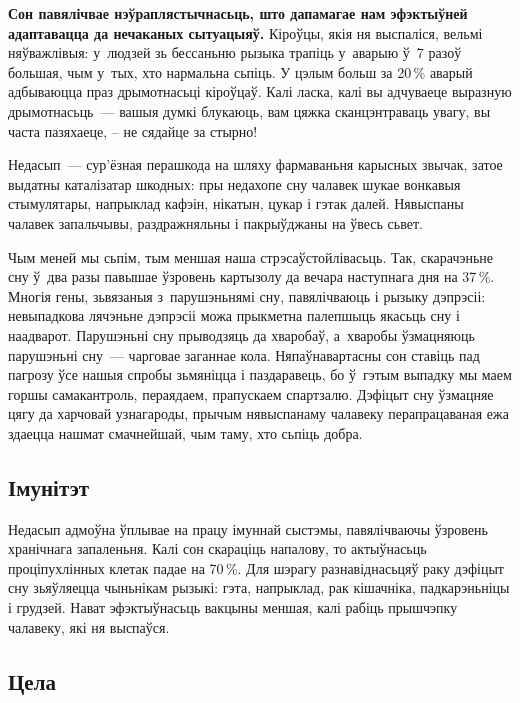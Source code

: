 \textbf{Сон павялічвае нэўраплястычнасьць, што дапамагае нам эфэктыўней адаптавацца да нечаканых сытуацыяў.} Кіроўцы, якія ня выспаліся, вельмі няўважлівыя: у~людзей зь бессаньню рызыка трапіць у~аварыю ў~7 разоў большая, чым у~тых, хто нармальна сьпіць. У цэлым больш за 20\,\% аварый адбываюцца праз дрымотнасьці кіроўцаў. Калі ласка, калі вы адчуваеце выразную дрымотнасьць~--- вашыя думкі блукаюць, вам цяжка сканцэнтраваць увагу, вы часта пазяхаеце, -- не сядайце за стырно!

Недасып~--- сур'ёзная перашкода на шляху фармаваньня карысных звычак, затое выдатны каталізатар шкодных: пры недахопе сну чалавек шукае вонкавыя стымулятары, напрыклад кафэін, нікатын, цукар і гэтак далей. Нявыспаны чалавек запальчывы, раздражняльны і пакрыўджаны на ўвесь сьвет. 


Чым меней мы сьпім, тым меншая наша стрэсаўстойлівасьць. Так, скарачэньне сну ў~два разы павышае ўзровень картызолу да вечара наступнага дня на 37\,\%. Многія гены, зьвязаныя з~парушэньнямі сну, павялічваюць і рызыку дэпрэсіі: невыпадкова лячэньне дэпрэсіі можа прыкметна палепшыць якасьць сну і наадварот. Парушэньні сну прыводзяць да хваробаў, а~хваробы ўзмацняюць парушэньні сну~--- чарговае заганнае кола. Няпаўнавартасны сон ставіць пад пагрозу ўсе нашыя спробы зьмяніцца і паздаравець, бо ў~гэтым выпадку мы маем горшы самакантроль, пераядаем, прапускаем спартзалю. Дэфіцыт сну ўзмацняе цягу да харчовай узнагароды, прычым нявыспанаму чалавеку перапрацаваная ежа здаецца нашмат смачнейшай, чым таму, хто сьпіць добра.

\subsection*{Імунітэт}

Недасып адмоўна ўплывае на працу імуннай сыстэмы, павялічваючы ўзровень хранічнага запаленьня. Калі сон скараціць напалову, то актыўнасьць проціпухлінных клетак падае на 70\,\%. Для шэрагу разнавіднасьцяў раку дэфіцыт сну зьяўляецца чыньнікам рызыкі: гэта, напрыклад, рак кішачніка, падкарэньніцы і грудзей. Нават эфэктыўнасьць вакцыны меншая, калі рабіць прышчэпку чалавеку, які ня выспаўся.

\subsection*{Цела}

